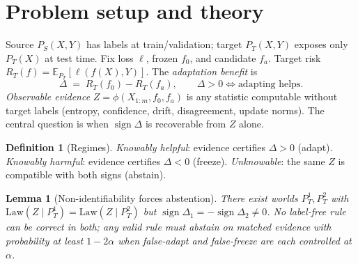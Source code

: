\documentclass[conference]{IEEEtran}
\theoremstyle{plain}
\newtheorem{lemma}{Lemma}
\theoremstyle{definition}
\newtheorem{definition}{Definition}
\theoremstyle{remark}
\newcommand{\E}{\mathbb{E}}
\newcommand{\sign}{\operatorname{sign}}
\newcommand{\Law}{\mathrm{Law}}
\begin{document}
\section{Problem setup and theory}\label{sec:setup}\label{sec:theory}
Source $P_S(X,Y)$ has labels at train/validation; target $P_T(X,Y)$ exposes only $P_T(X)$
at test time. Fix loss $\ell$, frozen $f_0$, and candidate $f_a$. Target risk
$R_T(f)=\E_{P_T}[\ell(f(X),Y)]$. The \emph{adaptation benefit} is
\begin{equation}
\Delta \;=\; R_T(f_0)-R_T(f_a),\qquad \Delta>0 \iff \text{adapting helps.}
\end{equation}
\emph{Observable evidence} $Z=\phi(X_{1:m},f_0,f_a)$ is any statistic computable without
target labels (entropy, confidence, drift, disagreement, update norms). The central
question is when $\sign\Delta$ is recoverable from $Z$ alone.

\begin{center}
\end{center}

\begin{definition}[Regimes]
\emph{Knowably helpful}: evidence certifies $\Delta>0$ (adapt).
\emph{Knowably harmful}: evidence certifies $\Delta<0$ (freeze).
\emph{Unknowable}: the same $Z$ is compatible with both signs (abstain).
\end{definition}

\begin{lemma}[Non-identifiability forces abstention]\label{lem:nonid}
There exist worlds $P_T^1,P_T^2$ with $\Law(Z\mid P_T^1)=\Law(Z\mid P_T^2)$ but
$\sign\Delta_1=-\sign\Delta_2\neq0$. No label-free rule can be correct in both; any
valid rule must abstain on matched evidence with probability at least $1-2\alpha$
when false-adapt and false-freeze are each controlled at $\alpha$.
\end{lemma}
\end{document}
